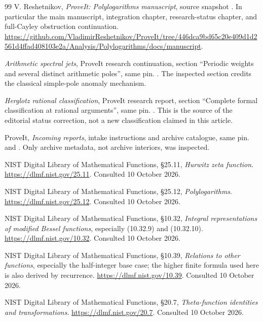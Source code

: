 \begin{thebibliography}{99}
V. Reshetnikov, \emph{ProveIt: Polylogarithms manuscript}, source snapshot
\qpin. In particular the main manuscript, integration chapter,
research-status chapter, and full-Cayley obstruction continuation.
\url{https://github.com/VladimirReshetnikov/ProveIt/tree/446dca9bd65c20e409d1d2561d4ffad408103e2a/Analysis/Polylogarithms/docs/manuscript}.

\emph{Arithmetic spectral jets}, ProveIt research continuation,
section ``Periodic weights and several distinct arithmetic poles'', same pin.
.
The inspected section credits the classical simple-pole anomaly mechanism.

\emph{Herglotz rational classification}, ProveIt research report,
section ``Complete formal classification at rational arguments'', same pin.
.
This is the source of the editorial status correction, not a new
classification claimed in this article.

ProveIt, \emph{Incoming reports}, intake instructions and archive catalogue,
same pin.  and .
Only archive metadata, not archive interiors, was inspected.

NIST Digital Library of Mathematical Functions, \S25.11,
\emph{Hurwitz zeta function}.
\url{https://dlmf.nist.gov/25.11}. Consulted 10 October 2026.

NIST Digital Library of Mathematical Functions, \S25.12,
\emph{Polylogarithms}.
\url{https://dlmf.nist.gov/25.12}. Consulted 10 October 2026.

NIST Digital Library of Mathematical Functions, \S10.32,
\emph{Integral representations of modified Bessel functions}, especially
(10.32.9) and (10.32.10).
\url{https://dlmf.nist.gov/10.32}. Consulted 10 October 2026.

NIST Digital Library of Mathematical Functions, \S10.39,
\emph{Relations to other functions}, especially the half-integer base case;
the higher finite formula used here is also derived by recurrence.
\url{https://dlmf.nist.gov/10.39}. Consulted 10 October 2026.

NIST Digital Library of Mathematical Functions, \S20.7,
\emph{Theta-function identities and transformations}.
\url{https://dlmf.nist.gov/20.7}. Consulted 10 October 2026.


\end{thebibliography}
